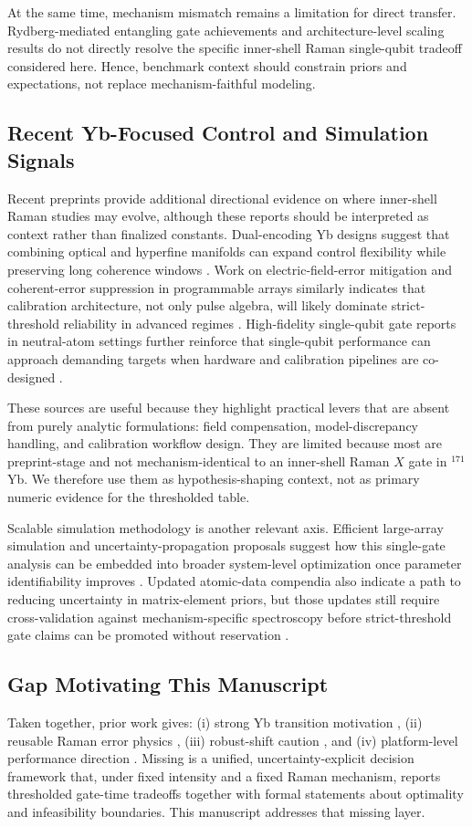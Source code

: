 \documentclass{article} %
\begin{document}
At the same time, mechanism mismatch remains a limitation for direct transfer. Rydberg-mediated entangling gate achievements and architecture-level scaling results do not directly resolve the specific inner-shell Raman single-qubit tradeoff considered here. Hence, benchmark context should constrain priors and expectations, not replace mechanism-faithful modeling.

\subsection{Recent Yb-Focused Control and Simulation Signals}
Recent preprints provide additional directional evidence on where inner-shell Raman studies may evolve, although these reports should be interpreted as context rather than finalized constants. Dual-encoding Yb designs suggest that combining optical and hyperfine manifolds can expand control flexibility while preserving long coherence windows \citep{S23}. Work on electric-field-error mitigation and coherent-error suppression in programmable arrays similarly indicates that calibration architecture, not only pulse algebra, will likely dominate strict-threshold reliability in advanced regimes \citep{S25,S29}. High-fidelity single-qubit gate reports in neutral-atom settings further reinforce that single-qubit performance can approach demanding targets when hardware and calibration pipelines are co-designed \citep{S34}.

These sources are useful because they highlight practical levers that are absent from purely analytic formulations: field compensation, model-discrepancy handling, and calibration workflow design. They are limited because most are preprint-stage and not mechanism-identical to an inner-shell Raman $X$ gate in $^{171}$Yb. We therefore use them as hypothesis-shaping context, not as primary numeric evidence for the thresholded table.

Scalable simulation methodology is another relevant axis. Efficient large-array simulation and uncertainty-propagation proposals suggest how this single-gate analysis can be embedded into broader system-level optimization once parameter identifiability improves \citep{S27}. Updated atomic-data compendia also indicate a path to reducing uncertainty in matrix-element priors, but those updates still require cross-validation against mechanism-specific spectroscopy before strict-threshold gate claims can be promoted without reservation \citep{S24}.

\subsection{Gap Motivating This Manuscript}
Taken together, prior work gives: (i) strong Yb transition motivation \citep{S01,S02,S06}, (ii) reusable Raman error physics \citep{S11,S12}, (iii) robust-shift caution \citep{S09,S10,S16}, and (iv) platform-level performance direction \citep{S13,S14,S15,S20,S21}. Missing is a unified, uncertainty-explicit decision framework that, under fixed intensity and a fixed Raman mechanism, reports thresholded gate-time tradeoffs together with formal statements about optimality and infeasibility boundaries. This manuscript addresses that missing layer.
\end{document}
